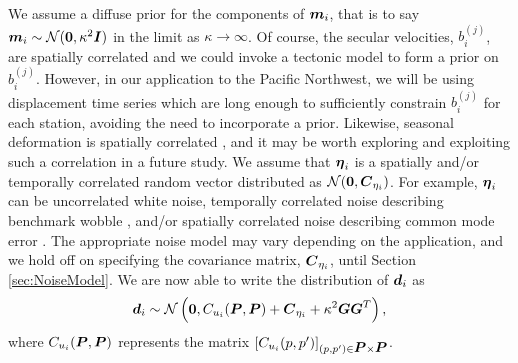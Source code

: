 \documentclass[extra,mreferee]{gji}
\begin{document}
We assume a diffuse prior for the components of $\mitbf{m}_i$, that is to say $\mitbf{m}_i \sim \mathcal{N}(\mitbf{0},\kappa^2\mitbf{I})$ in the limit as $\kappa \to \infty$. Of course, the secular velocities, $b_i^{(j)}$, are spatially correlated and we could invoke a tectonic model to form a prior on $b_i^{(j)}$. However, in our application to the Pacific Northwest, we will be using displacement time series which are long enough to sufficiently constrain $b_i^{(j)}$ for each station, avoiding the need to incorporate a prior. Likewise, seasonal deformation is spatially correlated \citep{Dong2002,Langbein2008}, and it may be worth exploring and exploiting such a correlation in a future study. We assume that $\mitbf{\eta}_i$ is a spatially and/or temporally correlated random vector distributed as $\mathcal{N}(\mitbf{0},\mitbf{C}_{\eta_i})$. For example, $\mitbf{\eta}_i$ can be uncorrelated white noise, temporally correlated noise describing benchmark wobble \citep[e.g.,][]{Wyatt1982,Wyatt1989}, and/or spatially correlated noise describing common mode error \citep[e.g.,][]{Wdowinski1997}. The appropriate noise model may vary depending on the application, and we hold off on specifying the covariance matrix, $\mitbf{C}_{\eta_i}$, until Section \ref{sec:NoiseModel}. We are now able to write the distribution of $\mitbf{d}_i$ as 
\begin{equation}\label{eq:DataDist}
\mitbf{d}_i \sim \mathcal{N}\left(\mitbf{0}, C_{u_i}(\mitbf{P},\mitbf{P}) + \mitbf{C}_{\eta_i}  + \kappa^2\mitbf{G}\mitbf{G}^T \right),
\end{equation}
where $C_{u_i}(\mitbf{P},\mitbf{P})$ represents the matrix $[C_{u_i}(p,p')]_{(p,p') \in \mitbf{P} \times \mitbf{P}}$. 
\end{document}

